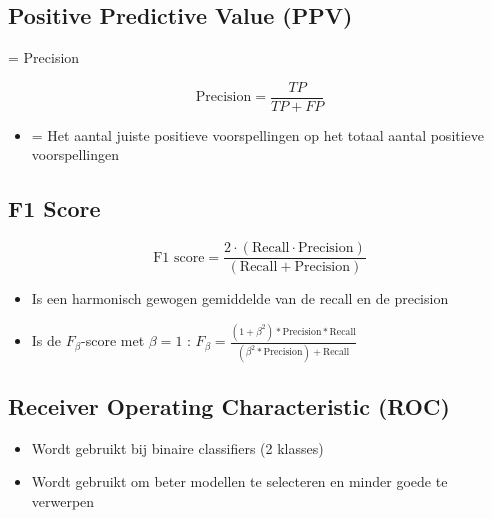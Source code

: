 \documentclass{article}
\begin{document}
\subsection{Positive Predictive Value (PPV)}

= Precision

\begin{equation}
    \text{Precision} = \frac{TP}{TP + FP}
\end{equation}

\begin{itemize}
    \item = Het aantal juiste positieve voorspellingen op het totaal aantal positieve voorspellingen
\end{itemize}

\subsection{F1 Score}

\begin{equation}
    \text{F1 score} = \frac{2\cdot(\text{Recall} \cdot \text{Precision})}{(\text{Recall} + \text{Precision})}
\end{equation}

\begin{itemize}
    \item Is een harmonisch gewogen gemiddelde van de recall en de precision
    \item Is de $F_\beta$-score met $\beta = 1$ : $F_{\beta} = \frac{(1+\beta^2)*\text{Precision}*\text{Recall}}{(\beta^2 * \text{Precision}) + \text{Recall}}$
\end{itemize}

\subsection{Receiver Operating Characteristic (ROC)}

\begin{itemize}
    \item Wordt gebruikt bij binaire classifiers (2 klasses)
    \item Wordt gebruikt om beter modellen te selecteren en minder goede te verwerpen
\end{itemize}
\end{document}
